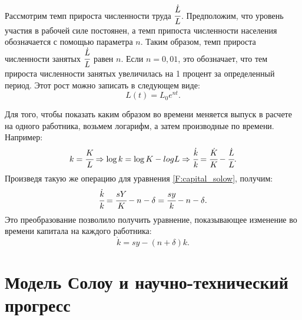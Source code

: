 Рассмотрим темп прироста численности труда $\cfrac{\dot{L}}{L}$.
Предположим, что уровень участия в рабочей силе постоянен, а темп припоста численности населения обозначается с помощью параметра $n$.
Таким образом, темп прироста численности занятых $\cfrac{\dot{L}}{L}$ равен $n$.
Если $n = 0,01$, это обозначает, что тем прироста численности занятых увеличилась на 1 процент за определенный период.
Этот рост можно записать в следующем виде:
\begin{equation*}
	L(t) = L_{0}e^{nt}\text{.}
\end{equation*}

Для того, чтобы показать каким образом во времени меняется выпуск в расчете на одного работника, возьмем логарифм, а затем производные по времени.
Например:
\begin{equation*}
	k = \cfrac{K}{L}\Rightarrow \log{k}=\log{K} - log{L} \Rightarrow \cfrac{\dot{k}}{k} = \cfrac{\dot{K}}{K} - \cfrac{\dot{L}}{L}\text{.}
\end{equation*}
Произведя такую же операцию для уравнения \ref{F:capital_solow}, получим:
\begin{equation*}
\cfrac{\dot{k}}{k} = \cfrac{sY}{K} - n - \delta = \cfrac{sy}{k} - n - \delta\text{.}
\end{equation*}
Это преобразование позволило получить уравнение, показывающее изменение во времени капитала на каждого работника:
\begin{equation*}
\dot{k}=sy-(n + \delta)k\text{.}
\end{equation*}

\section{Модель Солоу и научно-технический прогресс}
